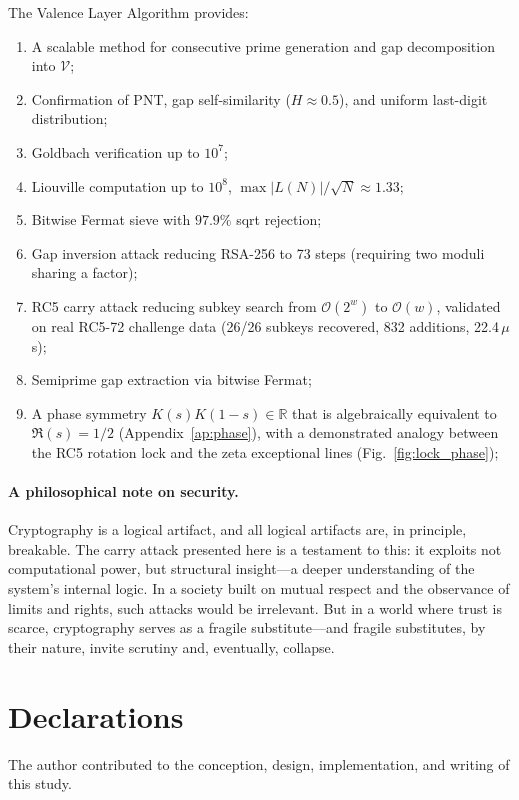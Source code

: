 \documentclass{sbc2023-pdf}%
\theoremstyle{plain}
\begin{document}
The Valence Layer Algorithm provides:
\begin{enumerate}
  \item A scalable method for consecutive prime generation and gap decomposition into \(\mathcal{V}\);
  \item Confirmation of PNT, gap self-similarity (\(H\approx0.5\)), and uniform last-digit distribution;
  \item Goldbach verification up to \(10^7\);
  \item Liouville computation up to \(10^8\), \(\max|L(N)|/\sqrt{N}\approx1.33\);
  \item Bitwise Fermat sieve with \(97.9\%\) sqrt rejection;
  \item Gap inversion attack reducing RSA-256 to 73 steps (requiring two moduli sharing a factor);
  \item RC5 carry attack reducing subkey search from \(\mathcal{O}(2^w)\) to \(\mathcal{O}(w)\), validated on real RC5-72 challenge data (26/26 subkeys recovered, 832 additions, 22.4\,$\mu$s);
  \item Semiprime gap extraction via bitwise Fermat;
  \item A phase symmetry \(K(s)K(1-s)\in\mathbb{R}\) that is algebraically equivalent to \(\Re(s)=1/2\) (Appendix~\ref{ap:phase}), with a demonstrated analogy between the RC5 rotation lock and the zeta exceptional lines (Fig.~\ref{fig:lock_phase});
\end{enumerate}

\paragraph{A philosophical note on security.}
Cryptography is a logical artifact, and all logical artifacts are, in principle, breakable. The carry attack presented here is a testament to this: it exploits not computational power, but structural insight---a deeper understanding of the system's internal logic. In a society built on mutual respect and the observance of limits and rights, such attacks would be irrelevant. But in a world where trust is scarce, cryptography serves as a fragile substitute---and fragile substitutes, by their nature, invite scrutiny and, eventually, collapse.

\section*{Declarations}

\begin{contributions}
The author contributed to the conception, design, implementation, and writing of this study.
\end{contributions}
\end{document}
